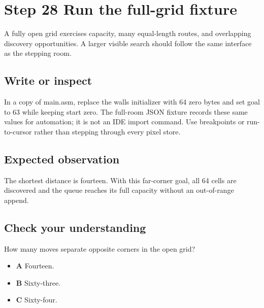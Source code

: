 \section{Step 28 Run the full-grid fixture}\label{maze-s28}

A fully open grid exercises capacity, many equal-length routes, and overlapping discovery opportunities. A larger visible search should follow the same interface as the stepping room.

\subsection{Write or inspect}

In a copy of main.asm, replace the walls initializer with 64 zero bytes and set goal to 63 while keeping start zero. The full-room JSON fixture records these same values for automation; it is not an IDE import command. Use breakpoints or run-to-cursor rather than stepping through every pixel store.

\subsection{Expected observation}

The shortest distance is fourteen. With this far-corner goal, all 64 cells are discovered and the queue reaches its full capacity without an out-of-range append.

\subsection{Check your understanding}

How many moves separate opposite corners in the open grid?

\begin{itemize}
  \item \textbf{A} Fourteen.
  \item \textbf{B} Sixty-three.
  \item \textbf{C} Sixty-four.
\end{itemize}

